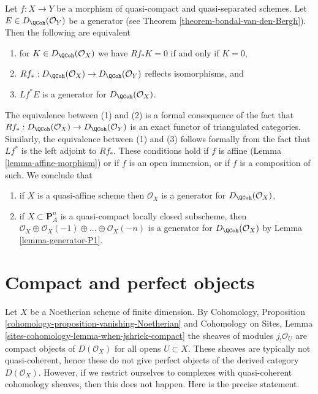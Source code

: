\begin{remark}
\label{remark-pullback-generator}
Let $f : X \to Y$ be a morphism of quasi-compact and quasi-separated schemes.
Let $E \in D_\QCoh(\mathcal{O}_Y)$ be a generator
(see Theorem \ref{theorem-bondal-van-den-Bergh}).
Then the following are equivalent
\begin{enumerate}
\item for $K \in D_\QCoh(\mathcal{O}_X)$ we have
$Rf_*K = 0$ if and only if $K = 0$,
\item $Rf_* : D_\QCoh(\mathcal{O}_X) \to D_\QCoh(\mathcal{O}_Y)$
reflects isomorphisms, and
\item $Lf^*E$ is a generator for $D_\QCoh(\mathcal{O}_X)$.
\end{enumerate}
The equivalence between (1) and (2) is a formal consequence of the fact that
$Rf_* : D_\QCoh(\mathcal{O}_X) \to D_\QCoh(\mathcal{O}_Y)$ is an
exact functor of triangulated categories. Similarly, the equivalence
between (1) and (3) follows formally from the fact that $Lf^*$
is the left adjoint to $Rf_*$.
These conditions hold if $f$ is affine (Lemma \ref{lemma-affine-morphism})
or if $f$ is an open immersion, or if $f$ is a composition of such.
We conclude that
\begin{enumerate}
\item if $X$ is a quasi-affine scheme then $\mathcal{O}_X$ is a generator
for $D_\QCoh(\mathcal{O}_X)$,
\item if $X \subset \mathbf{P}^n_A$ is a quasi-compact
locally closed subscheme, then
$\mathcal{O}_X \oplus \mathcal{O}_X(-1) \oplus \ldots \oplus \mathcal{O}_X(-n)$
is a generator for $D_\QCoh(\mathcal{O}_X)$ by
Lemma \ref{lemma-generator-P1}.
\end{enumerate}
\end{remark}




\section{Compact and perfect objects}
\label{section-compact}

\noindent
Let $X$ be a Noetherian scheme of finite dimension. By
Cohomology, Proposition \ref{cohomology-proposition-vanishing-Noetherian}
and
Cohomology on Sites, Lemma \ref{sites-cohomology-lemma-when-jshriek-compact}
the sheaves of modules $j_!\mathcal{O}_U$ are compact objects
of $D(\mathcal{O}_X)$ for all opens $U \subset X$.
These sheaves are typically not quasi-coherent, hence these
do not give perfect objects of the derived category $D(\mathcal{O}_X)$.
However, if we restrict ourselves to complexes with quasi-coherent
cohomology sheaves, then this does not happen.
Here is the precise statement.


